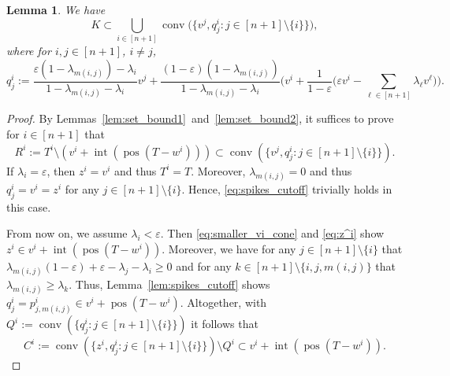 \documentclass{amsart}
\newtheorem{lemma}[theorem]{Lemma}
\DeclareMathOperator{\conv}{conv}
\DeclareMathOperator{\pos}{pos}
\DeclareMathOperator{\inte}{int}
\begin{document}
\begin{lemma}\label{lem:set_bound3}
We have
\[
	K
    \subset \bigcup_{i \in [n+1]} \conv \big( \big\{ v^j, q^i_j : j \in [n+1] \setminus \{i\} \big\} \big),
\]
where for $i,j \in [n+1]$, $i \neq j$,
\[
	q^i_j
    := \frac{\varepsilon (1 - \lambda_{m(i,j)}) - \lambda_i}{1 - \lambda_{m(i,j)} - \lambda_i} v^j + \frac{(1 - \varepsilon) (1 - \lambda_{m(i,j)})}{1 - \lambda_{m(i,j)} - \lambda_i} \Bigg( v^i + \frac{1}{1 - \varepsilon} \Bigg( \varepsilon v^i - \sum_{\ell \in [n+1]} \lambda_\ell v^\ell \Bigg) \Bigg).
\]
\end{lemma}
\begin{proof}
By Lemmas~\ref{lem:set_bound1}~and~\ref{lem:set_bound2},
it suffices to prove for $i \in [n+1]$ that
\begin{equation}\label{eq:spikes_cutoff}
	R^i
		:= T^i \setminus ( v^i + \inte(\pos( T - w^i )) )
		\subset \conv(\{ v^j, q^i_j : j \in [n+1] \setminus \{i\} \}).
\end{equation}
If $\lambda_i = \varepsilon$, then $z^i = v^i$ and thus $T^i = T$.
Moreover, $\lambda_{m(i,j)} = 0$ and thus $q^i_j = v^i = z^i$ for any $j \in [n+1] \setminus \{i\}$.
Hence, \eqref{eq:spikes_cutoff} trivially holds in this case.

From now on, we assume $\lambda_i < \varepsilon$.
Then \eqref{eq:smaller_vi_cone} and \eqref{eq:z^i}
show $z^i \in v^i + \inte(\pos( T - w^i ))$.
Moreover, we have for any $j \in [n+1] \setminus \{i\}$ that
$\lambda_{m(i,j)} (1 - \varepsilon) + \varepsilon - \lambda_j - \lambda_i \geq 0$
and for any $k \in [n+1] \setminus \{i,j,m(i,j)\}$ that $\lambda_{m(i,j)} \geq \lambda_k$.
Thus, Lemma~\ref{lem:spikes_cutoff} shows $q^i_j = p^i_{j,m(i,j)} \in v^i + \pos( T - w^i )$.
Altogether, with $Q^i := \conv(\{ q^i_j : j \in [n+1] \setminus \{i\} \})$ it follows that
\begin{equation}\label{eq:C^i}
	C^i
    := \conv(\{ z^i, q^i_j : j \in [n+1] \setminus \{i\} \}) \setminus Q^i
	\subset  v^i + \inte(\pos( T - w^i )).
\end{equation}


\end{proof}
\end{document}

